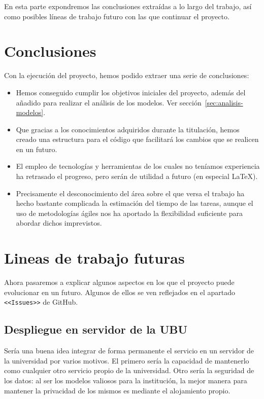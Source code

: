 
En esta parte expondremos las conclusiones extraídas a lo largo del trabajo, así como posibles líneas de trabajo futuro con las que continuar el proyecto.

\section{Conclusiones}
Con la ejecución del proyecto, hemos podido extraer una serie de conclusiones:
\begin{itemize}
	\item Hemos conseguido cumplir los objetivos iniciales del proyecto, además del añadido para realizar el análisis de los modelos. Ver sección~\ref{sec:analisis-modelos}.
	\item Que gracias a los conocimientos adquiridos durante la titulación, hemos creado una estructura para el código que facilitará los cambios que se realicen en un futuro.
	\item El empleo de tecnologías y herramientas de los cuales no teníamos experiencia ha retrasado el progreso, pero serán de utilidad a futuro (en especial \LaTeX).
	\item Precisamente el desconocimiento del área sobre el que versa el trabajo ha hecho bastante complicada la estimación del tiempo de las tareas, aunque el uso de metodologías ágiles nos ha aportado la flexibilidad suficiente para abordar dichos imprevistos.
\end{itemize}



\section{Lineas de trabajo futuras}
Ahora pasaremos a explicar algunos aspectos en los que el proyecto puede evolucionar en un futuro. Algunos de ellos se ven reflejados en el apartado \texttt{<<Issues>>} de GitHub.

\subsection{Despliegue en servidor de la UBU}
Sería una buena idea integrar de forma permanente el servicio en un servidor de la universidad por varios motivos. El primero sería la capacidad de mantenerlo como cualquier otro servicio propio de la universidad. Otro sería la seguridad de los datos: al ser los modelos valiosos para la institución, la mejor manera para mantener la privacidad de los mismos es mediante el alojamiento propio.


